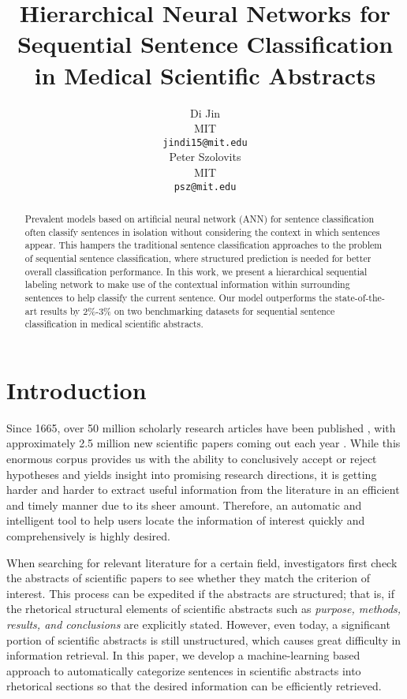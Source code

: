 \documentclass[11pt,a4paper]{article}
\title{Hierarchical Neural Networks for Sequential Sentence Classification in Medical Scientific Abstracts}
\author{Di Jin \\
  MIT \\
  {\tt jindi15@mit.edu} \\\And
  Peter Szolovits \\
  MIT \\
  {\tt psz@mit.edu} \\}
\date{}
\begin{document}
\maketitle
\begin{abstract}

Prevalent models based on artificial neural network (ANN) for sentence classification often classify sentences in isolation without considering the context in which sentences appear. This hampers the traditional sentence classification approaches to the problem of sequential sentence classification, where structured prediction is needed for better overall classification performance. In this work, we present a hierarchical sequential labeling network to make use of the contextual information within surrounding sentences to help classify the current sentence. Our model outperforms the state-of-the-art results by 2\%-3\% on two benchmarking datasets for sequential sentence classification in medical scientific abstracts. 


\end{abstract}

\section{Introduction}

Since 1665, over 50 million scholarly research articles have been published \cite{jinha2010article}, with approximately 2.5 million new scientific papers coming out each year \cite{ware2015stm}. While this enormous corpus provides us with the ability to conclusively accept or reject hypotheses and yields insight into promising research directions, it is getting harder and harder to extract useful information from the literature in an efficient and timely manner due to its sheer amount. Therefore, an automatic and intelligent tool to help users locate the information of interest quickly and comprehensively is highly desired. 


When searching for relevant literature for a certain field, investigators first check the abstracts of scientific papers to see whether they match the criterion of interest. This process can be expedited if the abstracts are structured; that is, if the rhetorical structural elements of scientific abstracts such as \textit{purpose, methods, results, and conclusions} \cite{american1979american} are explicitly stated. However, even  today, a significant portion of scientific abstracts is still unstructured, which causes great difficulty in information retrieval. In this paper, we develop a machine-learning based approach to automatically categorize sentences in scientific abstracts into rhetorical sections so that the desired information can be efficiently retrieved.
\end{document}
